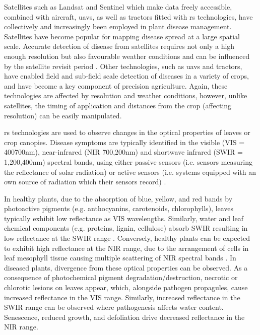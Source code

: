 Satellites such as Landsat and Sentinel which make data freely accessible, combined with aircraft, \acp{uav}, as well as tractors fitted with \ac{rs} technologies, have collectively and increasingly been employed in plant disease management. Satellites have become popular for mapping disease spread at a large spatial scale. Accurate detection of disease from satellites requires not only a high enough resolution but also favourable weather conditions and can be influenced by the satellite revisit period \parencite{Zhang2020}. Other technologies, such as \acp{uav} and tractors, have enabled field and sub-field scale detection of diseases in a variety of crops, and have become a key component of precision agriculture. Again, these technologies are affected by resolution and weather conditions, however, unlike satellites, the timing of application and distances from the crop (affecting resolution) can be easily manipulated.  

\Ac{rs} technologies are used to observe changes in the optical properties of leaves or crop canopies. Disease symptoms are typically identified in the visible (VIS = 400\textendash700nm), near-infrared (NIR \= 700,200nm) and shortwave infrared (SWIR = 1,200,400nm) spectral bands, using either passive sensors (i.e. sensors measuring the reflectance of solar radiation) or active sensors (i.e. systems equipped with an own source of radiation which their sensors record) \parencite{Mahlein2016}.  

In healthy plants, due to the absorption of blue, yellow, and red bands by photoactive pigments (e.g. anthocyanins, carotenoids, chlorophylls), leaves typically exhibit low reflectance as VIS wavelengths. Similarly, water and leaf chemical components (e.g. proteins, lignin, cellulose) absorb SWIR resulting in low reflectance at the SWIR range \parencite{West2010}. Conversely, healthy plants can be expected to exhibit high reflectance at the NIR range, due to the arrangement of cells in leaf mesophyll tissue causing multiple scattering of NIR spectral bands \parencite{Ollinger2011}. In diseased plants, divergence from these optical properties can be observed. As a consequence of photochemical pigment degradation/destruction, necrotic or chlorotic lesions on leaves appear, which, alongside pathogen propagules, cause increased reflectance in the VIS range. Similarly, increased reflectance in the SWIR range can be observed where pathogenesis affects water content. Senescence, reduced growth, and defoliation drive decreased reflectance in the NIR range.   


